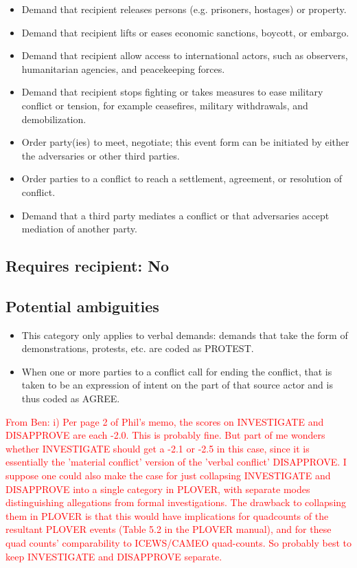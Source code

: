 \documentclass[11pt]{report}
\newcommand{\plcat}[1]{\textsf{#1}}
\newcommand{\andy}[1]{\textcolor{red}{#1}}
\begin{document}
\begin{itemize}
\item Demand that recipient releases persons (e.g. prisoners, hostages) or property.
\item Demand that recipient lifts or eases economic sanctions, boycott, or embargo.
\item Demand that recipient allow access to international actors, such as observers, humanitarian agencies, and peacekeeping forces.
\item Demand that recipient stops fighting or takes measures to ease military conflict or tension, for example ceasefires, military withdrawals, and demobilization.
\item Order party(ies) to meet, negotiate; this event form can be initiated by either the adversaries or other third parties.
\item Order parties to a conflict to reach a settlement, agreement, or resolution of conflict. 
\item Demand that a third party mediates a conflict or that adversaries accept mediation of another party.
\end{itemize}


\subsection{Requires recipient: No}


\subsection{Potential ambiguities}

\begin{itemize}
\item This category only applies to verbal demands: demands that take the form of demonstrations, protests, etc. are coded as \plcat{PROTEST}.
\item When one or more parties to a conflict call for ending the conflict, that is taken to be an expression of intent on the part of that source actor and is thus coded as \plcat{AGREE}.

\end{itemize}

\andy{From Ben: i) Per page 2 of Phil's memo, the scores on INVESTIGATE and DISAPPROVE are each -2.0. This is probably fine. But part of me wonders whether INVESTIGATE should get a -2.1 or -2.5 in this case, since it is essentially the 'material conflict' version of the 'verbal conflict' DISAPPROVE. I suppose one could also make the case for just collapsing INVESTIGATE and DISAPPROVE into a single category in PLOVER, with separate modes distinguishing allegations from formal investigations. The drawback to collapsing them in PLOVER is that this would have implications for quadcounts of the resultant PLOVER events (Table 5.2 in the PLOVER manual), and for these quad counts' comparability to ICEWS/CAMEO quad-counts. So probably best to keep INVESTIGATE and DISAPPROVE separate. }
\end{document}
